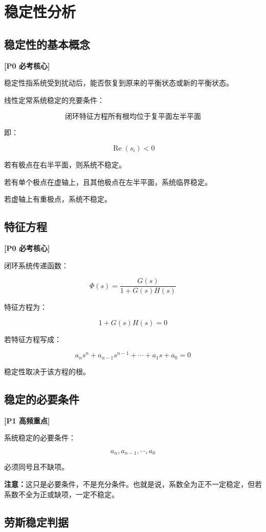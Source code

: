 \documentclass[UTF8,a4paper,12pt]{ctexart}
\newcommand{\Pzero}{\textcolor{p0}{\textbf{[P0 必考核心]}}}
\newcommand{\Pone}{\textcolor{p1}{\textbf{[P1 高频重点]}}}
\newcommand{\note}{\textcolor{note}{\textbf{注意：}}}
\begin{document}
\section{稳定性分析}

\subsection{稳定性的基本概念}

\Pzero

稳定性指系统受到扰动后，能否恢复到原来的平衡状态或新的平衡状态。

线性定常系统稳定的充要条件：

\[
\text{闭环特征方程所有根均位于复平面左半平面}
\]

即：

\[
\operatorname{Re}(s_i)<0
\]

若有极点在右半平面，则系统不稳定。

若有单个极点在虚轴上，且其他极点在左半平面，系统临界稳定。

若虚轴上有重极点，系统不稳定。

\subsection{特征方程}

\Pzero

闭环系统传递函数：

\[
\Phi(s)=\frac{G(s)}{1+G(s)H(s)}
\]

特征方程为：

\[
1+G(s)H(s)=0
\]

若特征方程写成：

\[
a_ns^n+a_{n-1}s^{n-1}+\cdots+a_1s+a_0=0
\]

稳定性取决于该方程的根。

\subsection{稳定的必要条件}

\Pone

系统稳定的必要条件：

\[
a_n,a_{n-1},\cdots,a_0
\]

必须同号且不缺项。

\note 这只是必要条件，不是充分条件。也就是说，系数全为正不一定稳定，但若系数不全为正或缺项，一定不稳定。

\subsection{劳斯稳定判据}
\end{document}
